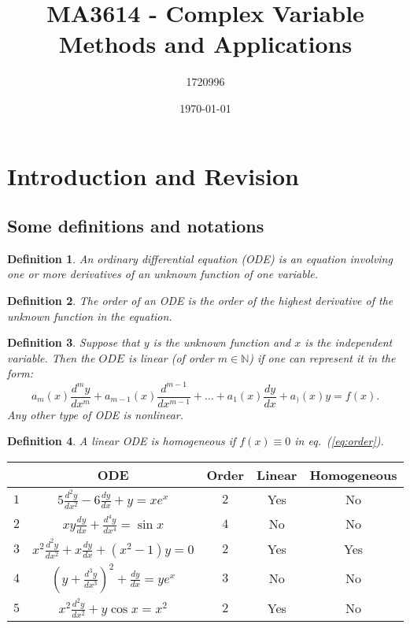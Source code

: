 \documentclass{article}
\title{MA3614 - Complex Variable Methods and Applications}
\author{1720996}
\date{\today}
\newtheorem{definition}{Definition}
\begin{document}
\maketitle

\tableofcontents

\section{Introduction and Revision}
\subsection{Some definitions and notations}
\begin{definition}
    An ordinary differential equation (ODE) is an equation involving one or more derivatives of an unknown function of one variable.
\end{definition}
\begin{definition}
    The order of an ODE is the order of the highest derivative of the unknown function in the equation.
\end{definition}
\begin{definition}
    Suppose that $y$ is the unknown function and $x$ is the independent variable. Then the $ODE$ is linear (of order $m\in \mathbb{N}$) if one can represent it in the form:
    \begin{equation}
        a_m(x)\frac{d^m y}{dx^m} + a_{m-1}(x)\frac{d^{m-1}}{dx^{m-1}} + \ldots + a_1(x)\frac{dy}{dx}+a_)(x) y=f(x). \label{eq:order}
    \end{equation}
    Any other type of ODE is nonlinear.
\end{definition}
\begin{definition}
    A linear ODE is homogeneous if $f(x)\equiv 0$ in eq.~(\ref{eq:order}).
\end{definition}

\begin{table}[h]
\begin{tabular}{|c|c|c|c|c|}
\hline
   & ODE & Order & Linear & Homogeneous \\ \hline
 $1$ & $ 5\frac{d^2 y}{dx^2} - 6\frac{dy}{dx} + y = xe^x $ & $2$ & Yes & No \\ 
 $2$ & $xy\frac{dy}{dx} + \frac{d^4 y}{dx^4} = \sin{x}$ & $4$ & No & No \\
 $3$ & $x^2\frac{d^2 y}{dx^2} + x\frac{dy}{dx} + (x^2 - 1)y = 0$ & $2$ & Yes & Yes \\
 $4$ & $\left( y+\frac{d^3 y}{dx^3} \right)^2 + \frac{dy}{dx} = ye^x$ & $3$ & No & No \\
 $5$ & $x^2\frac{d^2 y}{dx^2}+y\cos{x} = x^2$ & $2$ & Yes & No \\ \hline
\end{tabular}
\end{table}
\end{document}
